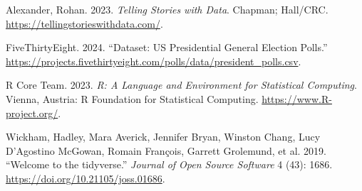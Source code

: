 \documentclass[
  letterpaper,
  DIV=11,
  numbers=noendperiod]{scrartcl}
\newlength{\cslhangindent}
\newenvironment{CSLReferences}[2] %
 {\begin{list}{}{%
  \setlength{\itemindent}{0pt}
  \setlength{\leftmargin}{0pt}
  \setlength{\parsep}{0pt}
  \ifodd #1
   \setlength{\leftmargin}{\cslhangindent}
   \setlength{\itemindent}{-1\cslhangindent}
  \fi
  \setlength{\itemsep}{#2\baselineskip}}}
 {\end{list}}
\begin{document}
\label{refs}
\begin{CSLReferences}{1}{0}
Alexander, Rohan. 2023. \emph{Telling Stories with Data}. Chapman;
Hall/CRC. \url{https://tellingstorieswithdata.com/}.

FiveThirtyEight. 2024. {``Dataset: US Presidential General Election
Polls.''}
\url{https://projects.fivethirtyeight.com/polls/data/president_polls.csv}.

R Core Team. 2023. \emph{{R: A Language and Environment for Statistical
Computing}}. Vienna, Austria: R Foundation for Statistical Computing.
\url{https://www.R-project.org/}.

Wickham, Hadley, Mara Averick, Jennifer Bryan, Winston Chang, Lucy
D'Agostino McGowan, Romain François, Garrett Grolemund, et al. 2019.
{``Welcome to the {tidyverse}.''} \emph{Journal of Open Source Software}
4 (43): 1686. \url{https://doi.org/10.21105/joss.01686}.

\end{CSLReferences}
\end{document}
